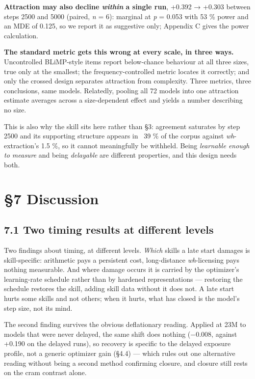 \documentclass[11pt]{article}
\begin{document}
\textbf{Attraction may also decline \emph{within} a single run}, +0.392 → +0.303 between steps 2500 and 5000 (paired, \emph{n} = 6): marginal at \emph{p} = 0.053 with 53 \% power and an MDE of 0.125, so we report it as suggestive only; Appendix C gives the power calculation.

\textbf{The standard metric gets this wrong at every scale, in three ways.} Uncontrolled
BLiMP-style items report below-chance behaviour at all three sizes, true only at the
smallest; the frequency-controlled metric locates it correctly; and only the crossed design
separates attraction from complexity. Three metrics, three conclusions, same models.
Relatedly, pooling all 72 models into one attraction estimate averages across a
size-dependent effect and yields a number describing no size.

This is also why the skill sits here rather than §3: agreement saturates by step 2500 and
its supporting structure appears in ~39 \% of the corpus against \emph{wh}-extraction's 1.5 \%, so
it cannot meaningfully be withheld. Being \emph{learnable enough to measure} and being
\emph{delayable} are different properties, and this design needs both.

\section{§7 Discussion}\label{discussion}

\subsection{7.1 Two timing results at different levels}\label{two-timing-results-at-different-levels}

Two findings about timing, at different levels. \emph{Which} skills a late start damages is
skill-specific: arithmetic pays a persistent cost, long-distance \emph{wh}-licensing pays nothing
measurable. And where damage occurs it is carried by the optimizer's learning-rate schedule
rather than by hardened representations — restoring the schedule restores the skill, adding
skill data without it does not. A late start hurts some skills and not others; when it
hurts, what has closed is the model's step size, not its mind.

The second finding survives the obvious deflationary reading. Applied at 23M to models that
were never delayed, the same shift does nothing (−0.008, against +0.190 on the delayed runs),
so recovery is specific to the delayed exposure profile, not a generic optimizer gain
(§4.4) — which rules out one alternative reading without being a second method confirming
closure, and closure still rests on the cram contrast alone.
\end{document}
